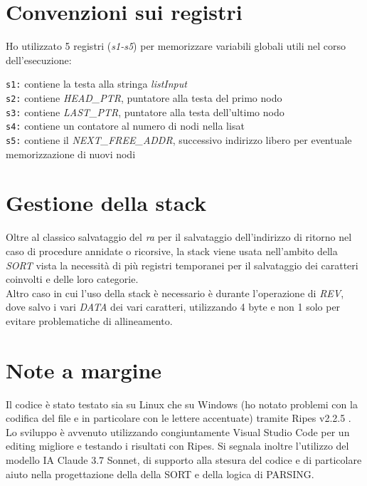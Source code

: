 \documentclass[11pt]{report}
\begin{document}
    \section{Convenzioni sui registri}
    Ho utilizzato 5 registri (\textit{s1-s5}) per memorizzare variabili globali
    utili nel corso dell'esecuzione:
    \begin{mdframed}
            \texttt{s1:} contiene la testa alla stringa \textit{listInput} \\
             \texttt{s2:} contiene \textit{HEAD\_PTR}, puntatore alla testa del primo nodo \\
             \texttt{s3:} contiene \textit{LAST\_PTR}, puntatore alla testa dell'ultimo nodo\\
             \texttt{s4:} contiene un contatore al numero di nodi nella lisat\\
             \texttt{s5:} contiene il \textit{NEXT\_FREE\_ADDR}, successivo indirizzo libero per eventuale memorizzazione di nuovi nodi\\
             
        \end{mdframed}
    
    \section{Gestione della stack}
    Oltre al classico salvataggio del \textit{ra} per il salvataggio dell'indirizzo di ritorno nel caso di procedure annidate o ricorsive, la stack viene usata nell'ambito della \textit{SORT} vista la necessità di più registri temporanei per il salvataggio dei caratteri coinvolti e delle loro categorie. \\Altro caso in cui l'uso della stack è necessario è durante l'operazione di \textit{REV}, dove salvo i vari \textit{DATA} dei vari caratteri, utilizzando 4 byte e non 1 solo per evitare problematiche di allineamento.\\

    \section{Note a margine}

    Il codice è stato testato sia su Linux che su Windows (ho notato problemi con la codifica del file e in particolare con le lettere accentuate) tramite Ripes v2.2.5 .
    Lo sviluppo è avvenuto utilizzando congiuntamente Visual Studio Code per un editing migliore e testando i risultati con Ripes. Si segnala inoltre l'utilizzo del modello IA Claude 3.7 Sonnet, di supporto alla stesura del codice e di particolare aiuto nella progettazione della della SORT e della logica di PARSING.
\end{document}
